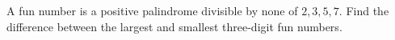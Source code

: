 A fun number is a positive palindrome divisible by none of $2,3,5,7$. Find the difference between the largest and smallest three-digit fun numbers.
